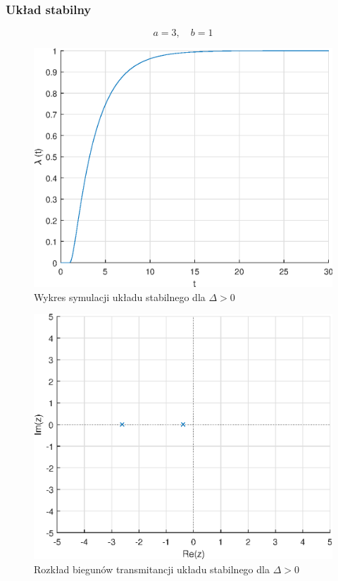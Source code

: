 \documentclass[a4paper]{article}
\begin{document}
\subsubsection{Układ stabilny}
$$
a=3,\quad b=1
$$
\begin{figure}[H]
    \centering
    \includegraphics[scale=0.6]{a1.eps}
    \caption{Wykres symulacji układu stabilnego dla $\Delta>0$}
\end{figure}
\begin{figure}[H]
    \centering
    \includegraphics[scale=0.6]{a1_z.eps}
    \caption{Rozkład biegunów transmitancji układu stabilnego dla $\Delta>0$}
\end{figure}
\end{document}
